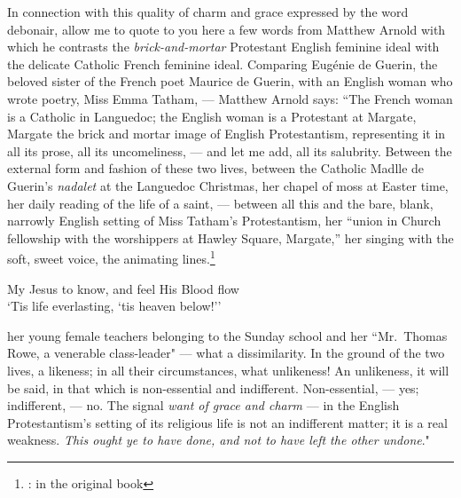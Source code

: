 In connection with this quality of charm and grace expressed by the word debonair, allow me to quote to you here a few words from Matthew Arnold with which he contrasts the \emph{brick-and-mortar} Protestant English feminine ideal with the delicate Catholic French feminine ideal.
Comparing Eug\'enie de Guerin, the beloved sister of the French poet Maurice de Guerin, with an English woman who wrote poetry, Miss Emma Tatham, --- Matthew Arnold says: ``The French woman is a Catholic in Languedoc; the English woman is a Protestant at Margate, Margate the brick and mortar image of English Protestantism, representing it in all its prose, all its uncomeliness, --- and let me add, all its salubrity.
Between the external form and fashion of these two lives, between the Catholic Madlle de Guerin's \emph{nadalet} at the Languedoc Christmas, her chapel of moss at Easter time, her daily reading of the life of a saint, --- between all this and the bare, blank, narrowly English setting of Miss Tatham's Protestantism, her ``union in Church fellowship with the worshippers at Hawley Square, Margate,'' her singing with the soft, sweet voice, the animating lines.\footnote{: in the original book}
\begin{center}
   My Jesus to know, and feel His Blood flow\\
   `Tis life everlasting, `tis heaven below!''\\
\end{center}
her young female teachers belonging to the Sunday school and her ``Mr.~Thomas Rowe, a venerable class-leader" --- what a dissimilarity.
In the ground of the two lives, a likeness; in all their circumstances, what unlikeness!
An unlikeness, it will be said, in that which is non-essential and indifferent.
Non-essential, --- yes; indifferent, --- no.
The signal \emph{want of grace and charm} --- in the English Protestantism's setting of its religious life is not an indifferent matter; it is a real weakness.
\emph{This ought ye to have done, and not to have left the other undone}."

